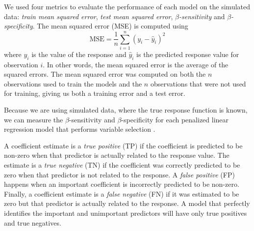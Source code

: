 \documentclass{article}
\begin{document}
	We used four metrics to evaluate the performance of each model on the simulated data: \textit{train mean squared error}, \textit{test mean squared error}, \textit{$\beta$-sensitivity} and \textit{$\beta$-specificity}. The mean squared error (MSE) is computed using
	\begin{equation}
		\text{MSE} = \frac{1}{n}\sum\limits_{i = 1}^n (y_i - \hat{y}_i)^2
	\end{equation}
	where $y_i$ is the value of the response and $\hat{y}_i$ is the predicted response value for observation $i$. In other words, the mean squared error is the average of the squared errors. The mean squared error was computed on both the $n$ observations used to train the models and the $n$ observations that were not used for training, giving us both a training error and a test error.
	
	Because we are using simulated data, where the true response function is known, we can measure the $\beta$-sensitivity and $\beta$-specificity for each penalized linear regression model that performs variable selection \cite{liu2020logsum}. 

	A coefficient estimate is a \textit{true positive} (TP) if the coefficient is predicted to be non-zero when that predictor is actually related to the response value. The estimate is a \textit{true negative} (TN) if the coefficient was correctly predicted to be zero when that predictor is not related to the response. A \textit{false positive} (FP) happens when an important coefficient is incorrectly predicted to be non-zero. Finally, a coefficient estimate is a \textit{false negative} (FN) if it was estimated to be zero but that predictor is actually related to the response. A model that perfectly identifies the important and unimportant predictors will have only true positives and true negatives.
	
\end{document}
